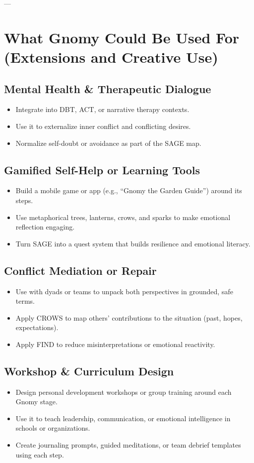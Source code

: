 \documentclass{article}
\begin{document}
---

\section{What Gnomy Could Be Used For (Extensions and Creative Use)}

\subsection{Mental Health \& Therapeutic Dialogue}
\begin{itemize}[noitemsep,topsep=0pt]
    \item Integrate into DBT, ACT, or narrative therapy contexts.
    \item Use it to externalize inner conflict and conflicting desires.
    \item Normalize self-doubt or avoidance as part of the SAGE map.
\end{itemize}

\subsection{Gamified Self-Help or Learning Tools}
\begin{itemize}[noitemsep,topsep=0pt]
    \item Build a mobile game or app (e.g., ``Gnomy the Garden Guide'') around its steps.
    \item Use metaphorical trees, lanterns, crows, and sparks to make emotional reflection engaging.
    \item Turn SAGE into a quest system that builds resilience and emotional literacy.
\end{itemize}

\subsection{Conflict Mediation or Repair}
\begin{itemize}[noitemsep,topsep=0pt]
    \item Use with dyads or teams to unpack both perspectives in grounded, safe terms.
    \item Apply CROWS to map others' contributions to the situation (past, hopes, expectations).
    \item Apply FIND to reduce misinterpretations or emotional reactivity.
\end{itemize}

\subsection{Workshop \& Curriculum Design}
\begin{itemize}[noitemsep,topsep=0pt]
    \item Design personal development workshops or group training around each Gnomy stage.
    \item Use it to teach leadership, communication, or emotional intelligence in schools or organizations.
    \item Create journaling prompts, guided meditations, or team debrief templates using each step.
\end{itemize}
\end{document}
